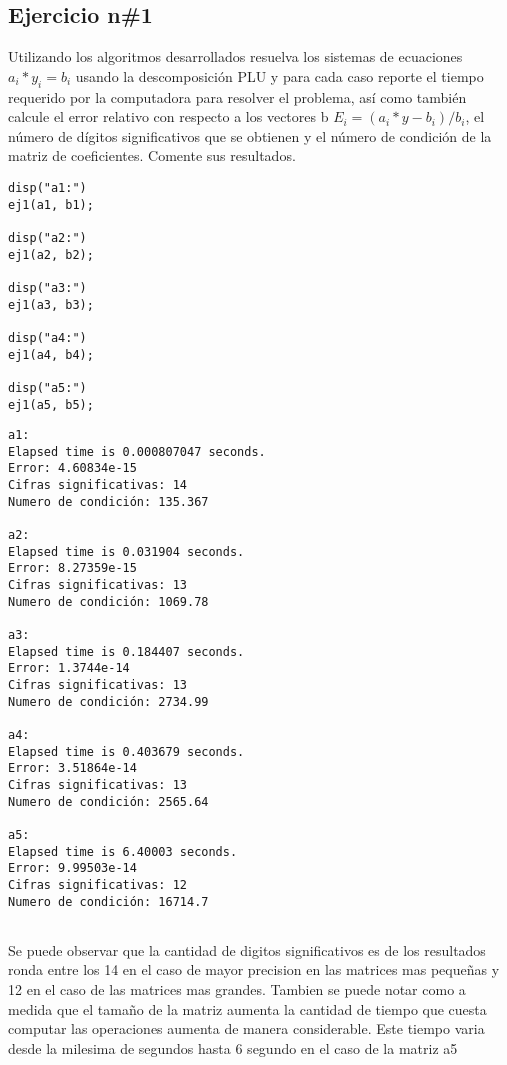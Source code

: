 \documentclass[10pt]{article}
\begin{document}
{}
\subsection*{Ejercicio n\#1}



Utilizando los algoritmos desarrollados resuelva los sistemas de ecuaciones
$a_i*y_i=b_i$ usando la descomposición PLU y para cada caso reporte el tiempo
requerido por la computadora para resolver el problema, así como también
calcule el error relativo con respecto a los vectores b $E_i=(a_i*y - b_i)/b_i$,
el número de dígitos significativos que se obtienen y el número de condición
de la matriz de coeficientes. Comente sus resultados.

\begin{lstlisting}
disp("a1:")
ej1(a1, b1);

disp("a2:")
ej1(a2, b2);

disp("a3:")
ej1(a3, b3);

disp("a4:")
ej1(a4, b4);

disp("a5:")
ej1(a5, b5);
\end{lstlisting}
\begin{lstlisting}[language={},xleftmargin=5pt,frame=none]
a1:
Elapsed time is 0.000807047 seconds.
Error: 4.60834e-15
Cifras significativas: 14
Numero de condición: 135.367
 
a2:
Elapsed time is 0.031904 seconds.
Error: 8.27359e-15
Cifras significativas: 13
Numero de condición: 1069.78
 
a3:
Elapsed time is 0.184407 seconds.
Error: 1.3744e-14
Cifras significativas: 13
Numero de condición: 2734.99
 
a4:
Elapsed time is 0.403679 seconds.
Error: 3.51864e-14
Cifras significativas: 13
Numero de condición: 2565.64
 
a5:
Elapsed time is 6.40003 seconds.
Error: 9.99503e-14
Cifras significativas: 12
Numero de condición: 16714.7
 

\end{lstlisting}


Se puede observar que la cantidad de digitos significativos es de los resultados
ronda entre los 14 en el caso de mayor precision en las matrices mas pequeñas
y 12 en el caso de las matrices mas grandes. Tambien se puede notar como a medida
que el tamaño de la matriz aumenta la cantidad de tiempo que cuesta computar las
operaciones aumenta de manera considerable. Este tiempo varia desde la milesima de
segundos hasta 6 segundo en el caso de la matriz a5
\end{document}
